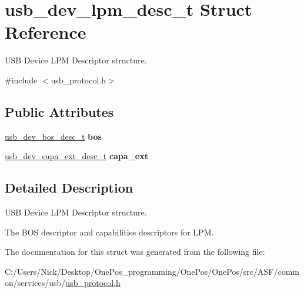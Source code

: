\hypertarget{structusb__dev__lpm__desc__t}{\section{usb\-\_\-dev\-\_\-lpm\-\_\-desc\-\_\-t Struct Reference}
\label{structusb__dev__lpm__desc__t}
}


U\-S\-B Device L\-P\-M Descriptor structure.  




{\ttfamily \#include $<$usb\-\_\-protocol.\-h$>$}

\subsection*{Public Attributes}
\begin{DoxyCompactItemize}
\item 
\hypertarget{structusb__dev__lpm__desc__t_ac26ee37dbfb31af3ecc8780610db50fc}{\hyperlink{structusb__dev__bos__desc__t}{usb\-\_\-dev\-\_\-bos\-\_\-desc\-\_\-t} {\bfseries bos}}\label{structusb__dev__lpm__desc__t_ac26ee37dbfb31af3ecc8780610db50fc}

\item 
\hypertarget{structusb__dev__lpm__desc__t_ac7eb6df67569cecc83a0da139e00fbe4}{\hyperlink{structusb__dev__capa__ext__desc__t}{usb\-\_\-dev\-\_\-capa\-\_\-ext\-\_\-desc\-\_\-t} {\bfseries capa\-\_\-ext}}\label{structusb__dev__lpm__desc__t_ac7eb6df67569cecc83a0da139e00fbe4}

\end{DoxyCompactItemize}


\subsection{Detailed Description}
U\-S\-B Device L\-P\-M Descriptor structure. 

The B\-O\-S descriptor and capabilities descriptors for L\-P\-M. 

The documentation for this struct was generated from the following file\-:\begin{DoxyCompactItemize}
\item 
C\-:/\-Users/\-Nick/\-Desktop/\-One\-Pos\-\_\-programming/\-One\-Pos/\-One\-Pos/src/\-A\-S\-F/common/services/usb/\hyperlink{usb__protocol_8h}{usb\-\_\-protocol.\-h}\end{DoxyCompactItemize}

